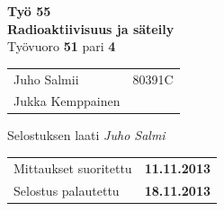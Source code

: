 \documentclass[a4paper,11pt]{article}
\begin{document}
\begin{titlepage}
\pagestyle{empty}
\begin{center}

\vspace*{3cm}
\noindent\LARGE{\textbf{Työ 
%
55
%
\\
%
Radioaktiivisuus ja säteily
%
}}\\
\vspace*{2cm}
Työvuoro \LARGE{\textbf{
%
51
%
}} pari \LARGE{\textbf{
%
4
}}\\
\vspace*{1cm}
\large{
\begin{tabular}{l l}
%
Juho Salmii & 80391C\\
Jukka Kemppainen & \\
%
\end{tabular}

\vspace*{1cm}
Selostuksen laati \emph{
%
Juho Salmi
%
} \\
\vspace*{1cm}
\begin{tabular}{l l}
Mittaukset suoritettu & \textbf{
%
11.11.2013
%
}\\
Selostus palautettu & \textbf{
%
18.11.2013
%
}\\
\end{tabular}
}
\end{center}
\end{titlepage}
\end{document}
